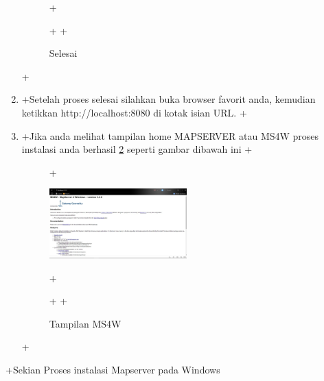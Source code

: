 \begin{enumerate}
\begin{figure}[ht]
 +	    \caption{Selesai}
 +		\label{gambar3}
 +		\end{figure}
 +\item
 +Setelah proses selesai silahkan buka browser favorit anda, kemudian ketikkan http://localhost:8080 di kotak isian URL.
 +\item
 +Jika anda melihat tampilan home MAPSERVER atau MS4W proses instalasi anda berhasil \ref{gambar4} seperti gambar dibawah ini
 +\begin{figure}[ht]
 +	    \centerline{\includegraphics[width=0.50\textwidth]{figures/img4}}
 +	    \caption{Tampilan MS4W}
 +		\label{gambar4}
 +		\end{figure}
 +\end{enumerate}
 +Sekian Proses instalasi Mapserver pada Windows
 

